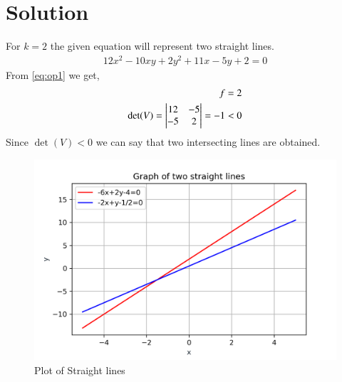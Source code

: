 \documentclass[journal,12pt,twocolumn]{IEEEtran}
\begin{document}
\section{Solution}
For $k = 2$ the given equation will represent two straight lines.
\begin{align}
12x^2-10xy+2y^2+11x-5y+2 = 0 \label{eq:op1}
\end{align}
From \eqref{eq:op1} we get, 
\begin{align}
    f = 2 \label{eq:f_value} \\
    \det(V) = \begin{vmatrix}12 & -5 \\ -5 & 2\end{vmatrix} = -1 < 0 
\end{align}
Since $\det(V)<0$ we can say that two intersecting lines are obtained.

\renewcommand{\thefigure}{\arabic{figure}}
\begin{figure}[h!]
	\centering
	\includegraphics[width=\columnwidth]{straightlines.png}
	\caption{Plot of Straight lines}
	\label{fig_1}
\end{figure}
\end{document}
